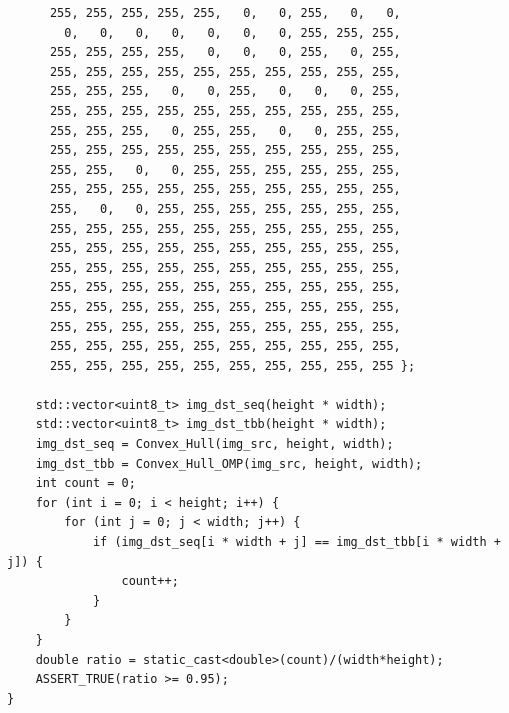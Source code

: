 \documentclass{report}
\begin{document}
\begin{lstlisting}
      255, 255, 255, 255, 255,   0,   0, 255,   0,   0,
        0,   0,   0,   0,   0,   0,   0, 255, 255, 255,
      255, 255, 255, 255,   0,   0,   0, 255,   0, 255,
      255, 255, 255, 255, 255, 255, 255, 255, 255, 255,
      255, 255, 255,   0,   0, 255,   0,   0,   0, 255,
      255, 255, 255, 255, 255, 255, 255, 255, 255, 255,
      255, 255, 255,   0, 255, 255,   0,   0, 255, 255,
      255, 255, 255, 255, 255, 255, 255, 255, 255, 255,
      255, 255,   0,   0, 255, 255, 255, 255, 255, 255,
      255, 255, 255, 255, 255, 255, 255, 255, 255, 255,
      255,   0,   0, 255, 255, 255, 255, 255, 255, 255,
      255, 255, 255, 255, 255, 255, 255, 255, 255, 255,
      255, 255, 255, 255, 255, 255, 255, 255, 255, 255,
      255, 255, 255, 255, 255, 255, 255, 255, 255, 255,
      255, 255, 255, 255, 255, 255, 255, 255, 255, 255,
      255, 255, 255, 255, 255, 255, 255, 255, 255, 255,
      255, 255, 255, 255, 255, 255, 255, 255, 255, 255,
      255, 255, 255, 255, 255, 255, 255, 255, 255, 255,
      255, 255, 255, 255, 255, 255, 255, 255, 255, 255 };

    std::vector<uint8_t> img_dst_seq(height * width);
    std::vector<uint8_t> img_dst_tbb(height * width);
    img_dst_seq = Convex_Hull(img_src, height, width);
    img_dst_tbb = Convex_Hull_OMP(img_src, height, width);
    int count = 0;
    for (int i = 0; i < height; i++) {
        for (int j = 0; j < width; j++) {
            if (img_dst_seq[i * width + j] == img_dst_tbb[i * width + j]) {
                count++;
            }
        }
    }
    double ratio = static_cast<double>(count)/(width*height);
    ASSERT_TRUE(ratio >= 0.95);
}


\end{lstlisting}
\end{document}
